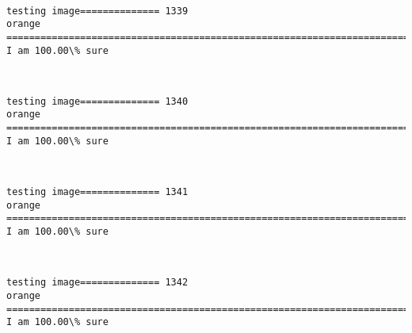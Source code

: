 \documentclass[11pt]{article}
\begin{document}
    \begin{center}
    \end{center}
    { \hspace*{\fill} \\}
    
    \begin{Verbatim}[commandchars=\\\{\}]
testing image============== 1339
orange
============================================================================
I am 100.00\% sure

    \end{Verbatim}

    \begin{center}
    \end{center}
    { \hspace*{\fill} \\}
    
    \begin{Verbatim}[commandchars=\\\{\}]
testing image============== 1340
orange
============================================================================
I am 100.00\% sure

    \end{Verbatim}

    \begin{center}
    \end{center}
    { \hspace*{\fill} \\}
    
    \begin{Verbatim}[commandchars=\\\{\}]
testing image============== 1341
orange
============================================================================
I am 100.00\% sure

    \end{Verbatim}

    \begin{center}
    \end{center}
    { \hspace*{\fill} \\}
    
    \begin{Verbatim}[commandchars=\\\{\}]
testing image============== 1342
orange
============================================================================
I am 100.00\% sure

    \end{Verbatim}
\end{document}
